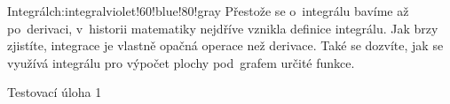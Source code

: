 \begin{chapterintro}{Integrál}{ch:integral}{violet!60!blue!80!gray}{}
    Přestože se o~integrálu bavíme až po~derivaci, v~historii matematiky nejdříve
    vznikla definice integrálu.
    Jak brzy zjistíte, integrace je vlastně opačná operace než derivace.
    Také se dozvíte, jak se využívá integrálu pro výpočet plochy pod~grafem určité
    funkce.
\end{chapterintro}

\begin{exercise}
    Testovací úloha 1
\end{exercise}
